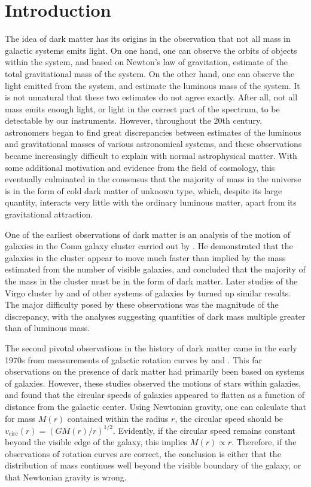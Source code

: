\documentclass[b5paper, 10pt, twoside]{book}
\begin{document}
\cleardoublepage
\mainmatter

\chapter{Introduction}

The idea of dark matter has its origins in the observation that not all mass in galactic systems emits light. On one hand, one can observe the orbits of objects within the system, and based on Newton's law of gravitation, estimate of the total gravitational mass of the system. On the other hand, one can observe the light emitted from the system, and estimate the luminous mass of the system. It is not unnatural that these two estimates do not agree exactly. After all, not all mass emits enough light, or light in the correct part of the spectrum, to be detectable by our instruments. However, throughout the 20th century, astronomers began to find great discrepancies between estimates of the luminous and gravitational masses of various astronomical systems, and these observations became increasingly difficult to explain with normal astrophysical matter. With some additional motivation and evidence from the field of cosmology, this eventually culminated in the consensus that the majority of mass in the universe is in the form of cold dark matter of unknown type, which, despite its large quantity, interacts very little with the ordinary luminous matter, apart from its gravitational attraction.

One of the earliest observations of dark matter is an analysis of the motion of galaxies in the Coma galaxy cluster carried out by \textcite{Zwicky1933}. He demonstrated that the galaxies in the cluster appear to move much faster than implied by the mass estimated from the number of visible galaxies, and concluded that the majority of the mass in the cluster must be in the form of dark matter. Later studies of the Virgo cluster by \textcite{Smith1936} and of other systems of galaxies by \textcite{Holmberg1937} turned up similar results. The major difficulty posed by these observations was the magnitude of the discrepancy, with the analyses suggesting quantities of dark mass multiple greater than of luminous mass.

The second pivotal observations in the history of dark matter came in the early 1970s from measurements of galactic rotation curves by \textcite{RubinFord1970} and \textcite{Freeman1970}. This far observations on the presence of dark matter had primarily been based on systems of galaxies. However, these studies observed the motions of stars within galaxies, and found that the circular speeds of galaxies appeared to flatten as a function of distance from the galactic center. Using Newtonian gravity, one can calculate that for mass $M(r)$ contained within the radius $r$, the circular speed should be $v_\text{circ}(r)=(GM(r)/r)^{1/2}$. Evidently, if the circular speed remains constant beyond the visible edge of the galaxy, this implies $M(r)\propto r$. Therefore, if the observations of rotation curves are correct, the conclusion is either that the distribution of mass continues well beyond the visible boundary of the galaxy, or that Newtonian gravity is wrong.
\end{document}
